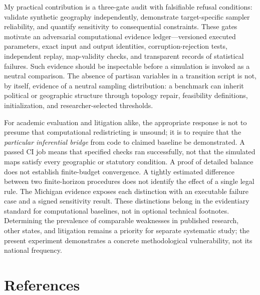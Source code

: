 \documentclass[
  10pt,
]{article}
\begin{document}
My practical contribution is a three-gate audit with falsifiable
refusal conditions: validate synthetic geography independently,
demonstrate target-specific sampler reliability, and quantify
sensitivity to consequential constraints. These gates motivate an
adversarial computational evidence ledger---versioned executed
parameters, exact input and output identities, corruption-rejection
tests, independent replay, map-validity checks, and transparent records
of statistical failures. Such evidence should be inspectable before a
simulation is invoked as a neutral comparison. The absence of partisan
variables in a transition script is not, by itself, evidence of a
neutral sampling distribution: a benchmark can inherit political or
geographic structure through topology repair, feasibility definitions,
initialization, and researcher-selected thresholds.

For academic evaluation and litigation alike, the appropriate response
is not to presume that computational redistricting is unsound; it is to
require that the \emph{particular inferential bridge} from code to
claimed baseline be demonstrated. A passed CI job means that specified
checks ran successfully, not that the simulated maps satisfy every
geographic or statutory condition. A proof of detailed balance does not
establish finite-budget convergence. A tightly estimated difference
between two finite-horizon procedures does not identify the effect of a
single legal rule. The Michigan evidence exposes each distinction with
an executable failure case and a signed sensitivity result. These
distinctions belong in the evidentiary standard for computational
baselines, not in optional technical footnotes. Determining the
prevalence of comparable weaknesses in published research, other states,
and litigation remains a priority for separate systematic study; the
present experiment demonstrates a concrete methodological vulnerability,
not its national frequency.

\hypertarget{references}{%
\section*{References}\label{references}}
\end{document}
